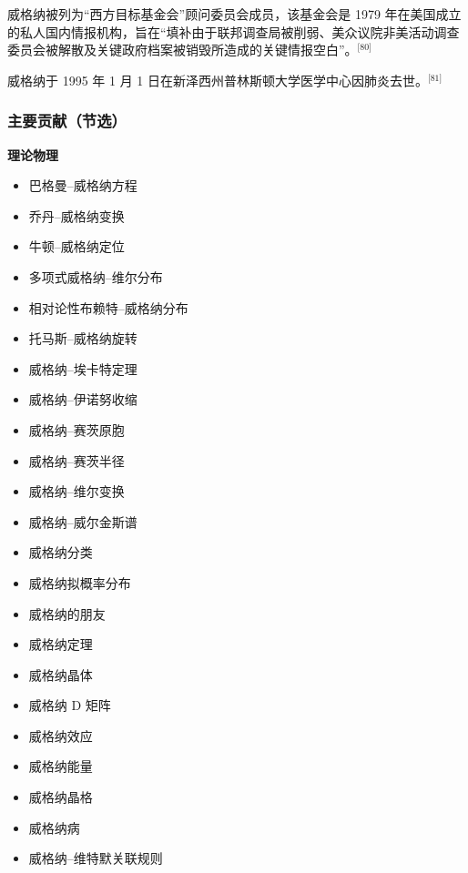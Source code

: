 威格纳被列为“西方目标基金会”顾问委员会成员，该基金会是 1979 年在美国成立的私人国内情报机构，旨在“填补由于联邦调查局被削弱、美众议院非美活动调查委员会被解散及关键政府档案被销毁所造成的关键情报空白”。\(^\text{[80]}\)

威格纳于 1995 年 1 月 1 日在新泽西州普林斯顿大学医学中心因肺炎去世。\(^\text{[81]}\)
\subsubsection{主要贡献（节选）}
\textbf{理论物理}
\begin{itemize}
\item 巴格曼–威格纳方程
\item 乔丹–威格纳变换
\item 牛顿–威格纳定位
\item 多项式威格纳–维尔分布
\item 相对论性布赖特–威格纳分布
\item 托马斯–威格纳旋转
\item 威格纳–埃卡特定理
\item 威格纳–伊诺努收缩
\item 威格纳–赛茨原胞
\item 威格纳–赛茨半径
\item 威格纳–维尔变换
\item 威格纳–威尔金斯谱
\item 威格纳分类
\item 威格纳拟概率分布
\item 威格纳的朋友
\item 威格纳定理
\item 威格纳晶体
\item 威格纳 D 矩阵
\item 威格纳效应
\item 威格纳能量
\item 威格纳晶格
\item 威格纳病
\item 威格纳–维特默关联规则
\end{itemize}